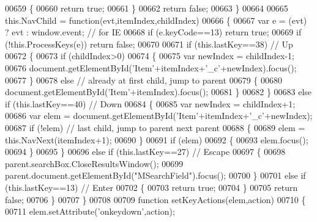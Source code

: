 \begin{DoxyCode}
00659       \{
00660         \textcolor{keywordflow}{return} \textcolor{keyword}{true};
00661       \}
00662       \textcolor{keywordflow}{return} \textcolor{keyword}{false};
00663     \}
00664 
00665     this.NavChild = \textcolor{keyword}{function}(evt,itemIndex,childIndex)
00666     \{
00667       var e  = (evt) ? evt : window.event; \textcolor{comment}{// for IE}
00668       if (e.keyCode==13) \textcolor{keywordflow}{return} \textcolor{keyword}{true};
00669       \textcolor{keywordflow}{if} (!this.ProcessKeys(e)) \textcolor{keywordflow}{return} \textcolor{keyword}{false};
00670 
00671       \textcolor{keywordflow}{if} (this.lastKey==38) \textcolor{comment}{// Up}
00672       \{
00673         \textcolor{keywordflow}{if} (childIndex>0)
00674         \{
00675           var newIndex = childIndex-1;
00676           document.getElementById(\textcolor{stringliteral}{'Item'}+itemIndex+\textcolor{stringliteral}{'\_c'}+newIndex).focus();
00677         \}
00678         \textcolor{keywordflow}{else} \textcolor{comment}{// already at first child, jump to parent}
00679         \{
00680           document.getElementById(\textcolor{stringliteral}{'Item'}+itemIndex).focus();
00681         \}
00682       \}
00683       \textcolor{keywordflow}{else} \textcolor{keywordflow}{if} (this.lastKey==40) \textcolor{comment}{// Down}
00684       \{
00685         var newIndex = childIndex+1;
00686         var elem = document.getElementById(\textcolor{stringliteral}{'Item'}+itemIndex+\textcolor{stringliteral}{'\_c'}+newIndex);
00687         \textcolor{keywordflow}{if} (!elem) \textcolor{comment}{// last child, jump to parent next parent}
00688         \{
00689           elem = this.NavNext(itemIndex+1);
00690         \}
00691         \textcolor{keywordflow}{if} (elem)
00692         \{
00693           elem.focus();
00694         \}
00695       \}
00696       \textcolor{keywordflow}{else} \textcolor{keywordflow}{if} (this.lastKey==27) \textcolor{comment}{// Escape}
00697       \{
00698         parent.searchBox.CloseResultsWindow();
00699         parent.document.getElementById(\textcolor{stringliteral}{"MSearchField"}).focus();
00700       \}
00701       \textcolor{keywordflow}{else} \textcolor{keywordflow}{if} (this.lastKey==13) \textcolor{comment}{// Enter}
00702       \{
00703         \textcolor{keywordflow}{return} \textcolor{keyword}{true};
00704       \}
00705       \textcolor{keywordflow}{return} \textcolor{keyword}{false};
00706     \}
00707 \}
00708 
00709 \textcolor{keyword}{function} setKeyActions(elem,action)
00710 \{
00711   elem.setAttribute(\textcolor{stringliteral}{'onkeydown'},action);

\end{DoxyCode}
